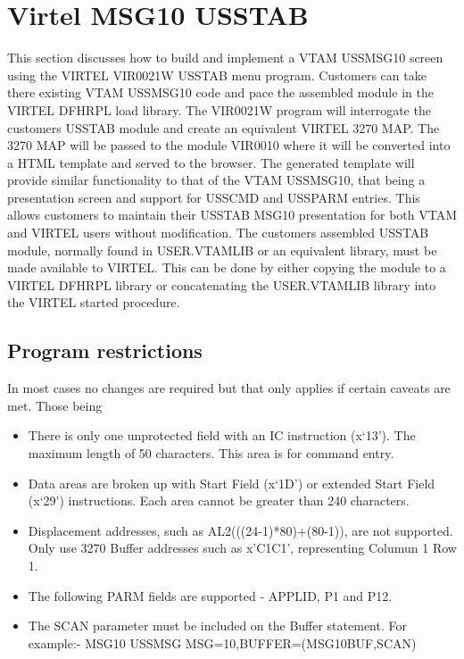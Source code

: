 \documentclass[letterpaper,10pt,english]{sphinxmanual}
\begin{document}
\chapter{Virtel MSG10 USSTAB}
\label{\detokenize{Customization:virtel-msg10-usstab}}\label{\detokenize{Customization:index-123}}
This section discusses how to build and implement a VTAM USSMSG10 screen using the VIRTEL VIR0021W USSTAB menu program. Customers can take there existing VTAM USSMSG10 code and pace the assembled module in the VIRTEL DFHRPL load library. The VIR0021W program will interrogate the customers USSTAB module and create an equivalent VIRTEL 3270 MAP. The 3270 MAP will be passed to the module VIR0010 where it will be converted into a HTML template and served to the browser. The generated template will provide similar functionality to that of the VTAM USSMSG10, that being a presentation screen and support for USSCMD and USSPARM entries. This allows customers to maintain their USSTAB MSG10 presentation for both VTAM and VIRTEL users without modification. The customers assembled USSTAB module, normally found in USER.VTAMLIB or an equivalent library, must be made available to VIRTEL. This can be done by either copying the module to a VIRTEL DFHRPL library or concatenating the USER.VTAMLIB library into the VIRTEL started procedure.


\section{Program restrictions}
\label{\detokenize{Customization:program-restrictions}}
In most cases no changes are required but that only applies if certain caveats are met. Those being
\begin{itemize}
\item {} 
There is only one unprotected field with an IC instruction (x‘13’). The maximum length of 50 characters. This area is for command entry.

\item {} 
Data areas are broken up with Start Field (x‘1D’) or extended Start Field (x‘29’) instructions. Each area cannot be greater than 240 characters.

\item {} 
Displacement addresses, such as AL2(((24-1)*80)+(80-1)), are not supported. Only use 3270 Buffer addresses such as x’C1C1’, representing Columun 1 Row 1.

\item {} 
The following PARM fields are supported - APPLID, P1 and P12.

\item {} 
The SCAN parameter must be included on the Buffer statement. For example:- MSG10 USSMSG MSG=10,BUFFER=(MSG10BUF,SCAN)

\end{itemize}
\end{document}
